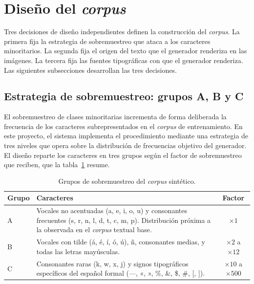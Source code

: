 \section{Diseño del \textit{corpus}}
\label{sec:diseno-corpus}

Tres decisiones de diseño independientes definen la construcción del \textit{corpus}. La primera fija la estrategia de sobremuestreo que ataca a los caracteres minoritarios. La segunda fija el origen del texto que el generador renderiza en las imágenes. La tercera fija las fuentes tipográficas con que el generador renderiza. Las siguientes subsecciones desarrollan las tres decisiones.

\subsection{Estrategia de sobremuestreo: grupos A, B y C}
\label{subsec:sobremuestreo}

El sobremuestreo de clases minoritarias incrementa de forma deliberada la frecuencia de los caracteres subrepresentados en el \textit{corpus} de entrenamiento. En este proyecto, el sistema implementa el procedimiento mediante una estrategia de tres niveles que opera sobre la distribución de frecuencias objetivo del generador. El diseño reparte los caracteres en tres grupos según el factor de sobremuestreo que reciben, que la tabla~\ref{tab:grupos-sobremuestreo} resume.

\begin{table}[!htbp]
	\centering
	\caption{Grupos de sobremuestreo del \textit{corpus} sintético.}
	\label{tab:grupos-sobremuestreo}
	\begin{tabular}{lp{8.5cm}c}
		\toprule
		\textbf{Grupo} & \textbf{Caracteres} & \textbf{Factor} \\
		\midrule
		A & Vocales no acentuadas (a, e, i, o, u) y consonantes frecuentes (s, r, n, l, d, t, c, m, p). Distribución próxima a la observada en el \textit{corpus} textual base. & $\times 1$ \\
		\addlinespace
		B & Vocales con tilde (á, é, í, ó, ú), ñ, consonantes medias, y todas las letras mayúsculas. & $\times 2$ a $\times 12$ \\
		\addlinespace
		C & Consonantes raras (k, w, x, j) y signos tipográficos específicos del español formal (—, «, », \%, \&, \$, \#, [, ]). & $\times 10$ a $\times 500$ \\
		\bottomrule
	\end{tabular}
\end{table}


